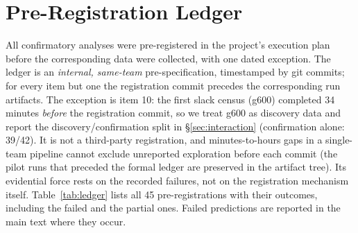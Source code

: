 \documentclass{article}
\theoremstyle{remark}
\begin{document}
\section{Pre-Registration Ledger}
\label{app:ledger}
All confirmatory analyses were pre-registered in the project's execution plan
before the corresponding data were collected, with one dated exception. The
ledger is an \emph{internal, same-team} pre-specification, timestamped by
git commits; for every item but one the registration commit precedes the
corresponding run artifacts. The exception is item 10: the first slack
census (g600) completed 34 minutes \emph{before} the registration commit,
so we treat g600 as discovery data and report the
discovery/confirmation split in \S\ref{sec:interaction} (confirmation
alone: 39/42). It is not a
third-party registration, and minutes-to-hours gaps in a single-team
pipeline cannot exclude unreported exploration before each commit (the
pilot runs that preceded the formal ledger are preserved in the artifact
tree). Its
evidential force rests on the recorded failures, not on the registration
mechanism itself. Table~\ref{tab:ledger} lists
all 45 pre-registrations with their outcomes, including the failed and
the partial ones. Failed predictions are reported in the main text where they occur.
\end{document}
